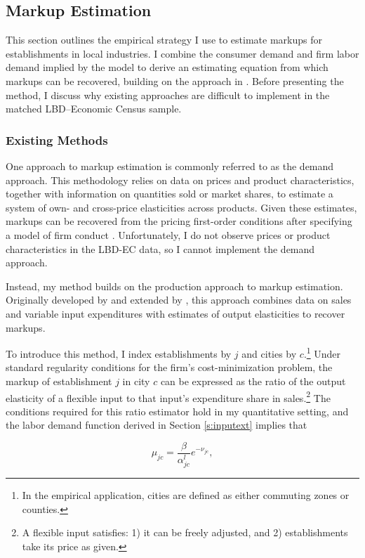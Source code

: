\subsection{Markup Estimation}
This section outlines the empirical strategy I use to estimate markups for establishments in local industries. I combine the consumer demand and firm labor demand implied by the model to derive an estimating equation from which markups can be recovered, building on the approach in \textcite{DeLoecker11}. Before presenting the method, I discuss why existing approaches are difficult to implement in the matched LBD–Economic Census sample.

\subsubsection{Existing Methods}
One approach to markup estimation is commonly referred to as the demand approach. This methodology relies on data on prices and product characteristics, together with information on quantities sold or market shares, to estimate a system of own- and cross-price elasticities across products. Given these estimates, markups can be recovered from the pricing first-order conditions after specifying a model of firm conduct \parencite{Ackerbergetal07,BerryGaynor&ScottMorton19}. Unfortunately, I do not observe prices or product characteristics in the LBD-EC data, so I cannot implement the demand approach.

Instead, my method builds on the production approach to markup estimation. Originally developed by \textcite{Hall1988} and extended by \textcite{DeLoecker&Warzynski12}, this approach combines data on sales and variable input expenditures with estimates of output elasticities to recover markups.

To introduce this method, I index establishments by $j$ and cities by $c$.\footnote{In the empirical application, cities are defined as either commuting zones or counties.} Under standard regularity conditions for the firm’s cost-minimization problem, the markup of establishment $j$ in city $c$ can be expressed as the ratio of the output elasticity of a flexible input to that input’s expenditure share in sales.\footnote{A flexible input satisfies: 1) it can be freely adjusted, and 2) establishments take its price as given.} The conditions required for this ratio estimator hold in my quantitative setting, and the labor demand function derived in Section \ref{s:inputext} implies that

\begin{equation}\label{eq:ratioest}
\mu_{jc} = \frac{\beta}{\alpha_{jc}^l} e^{-\nu_{jc}},
\end{equation}

